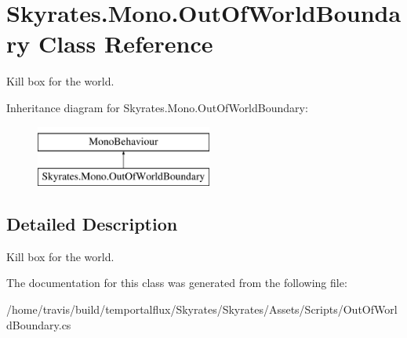\hypertarget{class_skyrates_1_1_mono_1_1_out_of_world_boundary}{\section{Skyrates.\-Mono.\-Out\-Of\-World\-Boundary Class Reference}
\label{class_skyrates_1_1_mono_1_1_out_of_world_boundary}
}


Kill box for the world.  


Inheritance diagram for Skyrates.\-Mono.\-Out\-Of\-World\-Boundary\-:\begin{figure}[H]
\begin{center}
\leavevmode
\includegraphics[height=2.000000cm]{class_skyrates_1_1_mono_1_1_out_of_world_boundary}
\end{center}
\end{figure}


\subsection{Detailed Description}
Kill box for the world. 



The documentation for this class was generated from the following file\-:\begin{DoxyCompactItemize}
\item 
/home/travis/build/temportalflux/\-Skyrates/\-Skyrates/\-Assets/\-Scripts/Out\-Of\-World\-Boundary.\-cs\end{DoxyCompactItemize}
